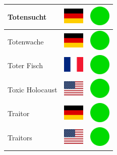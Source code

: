 \documentclass[12pt, a4paper, twoside]{report}
\begin{document}
\begin{center}
\begin{longtable}{|p{5cm}|p{2cm}|p{2cm}|}
 Totensucht                                                 & \includegraphics[width=1cm]{../4x3/de} &   \includegraphics[width=1cm]{../likes/y} \\ \hline
 Totenwache                                                 & \includegraphics[width=1cm]{../4x3/de} &   \includegraphics[width=1cm]{../likes/y} \\ \hline
 Toter Fisch                                                & \includegraphics[width=1cm]{../4x3/fr} &   \includegraphics[width=1cm]{../likes/y} \\ \hline
 Toxic Holocaust                                            & \includegraphics[width=1cm]{../4x3/us} &   \includegraphics[width=1cm]{../likes/y} \\ \hline
 Traitor                                                    & \includegraphics[width=1cm]{../4x3/de} &   \includegraphics[width=1cm]{../likes/y} \\ \hline
 Traitors                                                   & \includegraphics[width=1cm]{../4x3/us} &   \includegraphics[width=1cm]{../likes/y} \\ \hline

\end{longtable}
\end{center}
\end{document}
